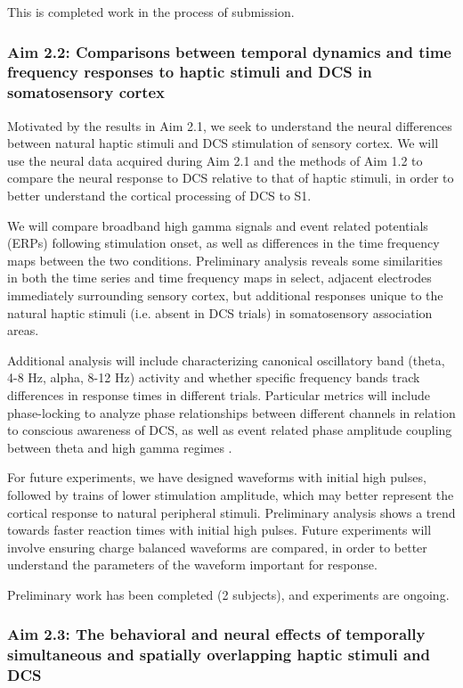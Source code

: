 This is completed work in the process of submission.

\subsubsection{Aim 2.2: Comparisons between temporal dynamics and time frequency responses to haptic stimuli and DCS in somatosensory cortex}

Motivated by the results in Aim 2.1, we seek to understand the neural differences between natural haptic stimuli and DCS stimulation of sensory cortex. We will use the neural data acquired during Aim 2.1 and the methods of Aim 1.2 to compare the neural response to DCS relative to that of haptic stimuli, in order to better understand the cortical processing of DCS to S1. 

We will compare broadband high gamma signals and event related potentials (ERPs) following stimulation onset, as well as differences in the time frequency maps between the two conditions. Preliminary analysis reveals some similarities in both the time series and time frequency maps in select, adjacent electrodes immediately surrounding sensory cortex, but additional responses unique to the natural haptic stimuli (i.e. absent in DCS trials) in somatosensory association areas. 

Additional analysis will include characterizing canonical oscillatory band (theta, 4-8 Hz, alpha, 8-12 Hz) activity and whether specific frequency bands track differences in response times in different trials. Particular metrics will include phase-locking to analyze phase relationships between different channels in relation to conscious awareness of DCS, as well as event related phase amplitude coupling between theta and high gamma regimes \cite{Voytek2013}.  

For future experiments, we have designed waveforms with initial high pulses, followed by trains of lower stimulation amplitude, which may better represent the cortical response to natural peripheral stimuli. Preliminary analysis shows a trend towards faster reaction times with initial high pulses. Future experiments will involve ensuring charge balanced waveforms are compared, in order to better understand the parameters of the waveform important for response. 

Preliminary work has been completed (2 subjects), and experiments are ongoing. 

\subsubsection{Aim 2.3: The behavioral and neural effects of temporally simultaneous and spatially overlapping haptic stimuli and DCS}

